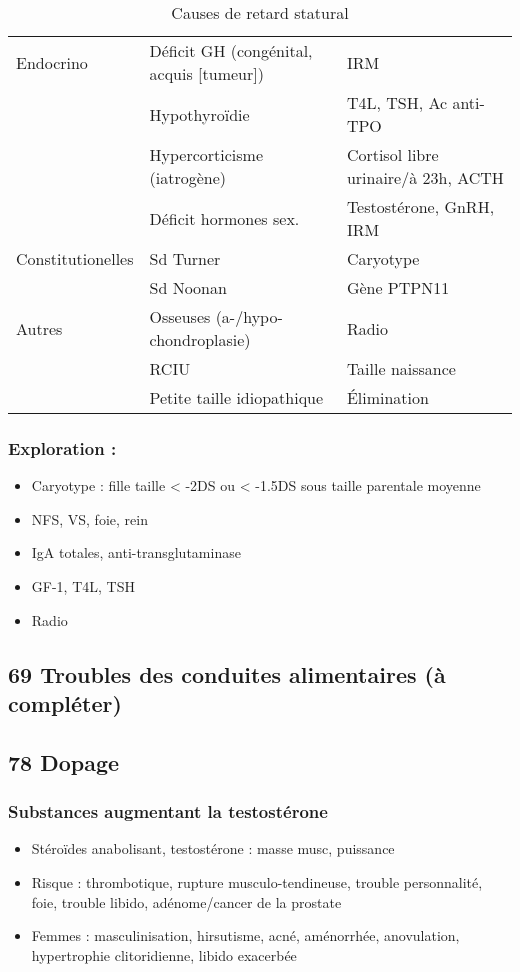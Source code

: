 \documentclass[11pt]{article}
\begin{document}
\begin{table}[htbp]
\caption{\label{tab:orgb58b7a0}Causes de retard statural}
\centering
\begin{tabular}{lll}
Endocrino & Déficit GH (congénital, acquis [tumeur]) & IRM\\
 & Hypothyroïdie & T4L, TSH, Ac anti-TPO\\
 & Hypercorticisme (iatrogène) & Cortisol libre urinaire/à 23h, ACTH\\
 & Déficit hormones sex. & Testostérone, GnRH, IRM\\
\hline
Constitutionelles & Sd Turner & Caryotype\\
 & Sd Noonan & Gène PTPN11\\
\hline
Autres & Osseuses (a-/hypo-chondroplasie) & Radio\\
 & RCIU & Taille naissance\\
 & Petite taille idiopathique & Élimination\\
\end{tabular}
\end{table}


\subsubsection{Exploration :}
\label{sec:orgc783281}
\begin{itemize}
\item Caryotype : fille taille < -2DS ou < -1.5DS sous taille parentale moyenne
\item NFS, VS, foie, rein
\item IgA totales, anti-transglutaminase
\item GF-1, T4L, TSH
\item Radio
\end{itemize}

\subsection{69 \textdagger{} Troubles des conduites alimentaires (à compléter)}
\label{sec:orgbb3c4a0}
\subsection{78 \textdagger{} Dopage}
\label{sec:orgd33e482}
\subsubsection{Substances augmentant la testostérone}
\label{sec:org6cad35c}
\begin{itemize}
\item Stéroïdes anabolisant, testostérone : \inc masse musc, puissance
\item Risque : thrombotique, rupture musculo-tendineuse, trouble personnalité, foie, trouble libido, adénome/cancer de la prostate
\item Femmes : masculinisation, hirsutisme, acné, aménorrhée, anovulation, hypertrophie clitoridienne, libido exacerbée
\end{itemize}
\end{document}
